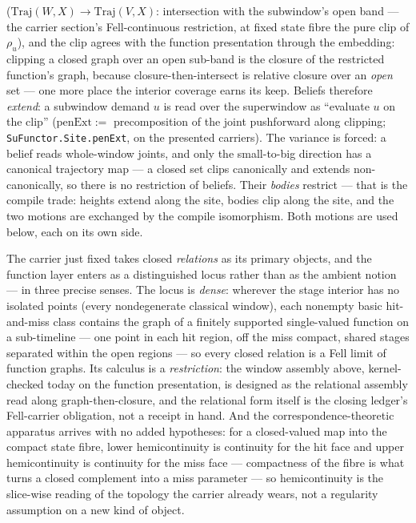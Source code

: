 ($\mathrm{Traj}(W,X) \to \mathrm{Traj}(V,X)$: intersection with the
subwindow's open band --- the carrier section's Fell-continuous
restriction, at fixed state fibre the pure clip of $\rho_u$), and
the clip agrees with the function presentation through the
embedding: clipping a closed graph over an open sub-band is the
closure of the restricted function's graph, because
closure-then-intersect is relative closure over an \emph{open} set
--- one more place the interior coverage earns its keep. Beliefs
therefore \emph{extend}: a subwindow demand
$u$ is read over the superwindow as ``evaluate $u$ on the clip''
($\mathrm{penExt} := $ precomposition of the joint pushforward along
clipping; \texttt{SuFunctor.Site.penExt}, on the presented
carriers). The variance is forced: a
belief reads whole-window
joints, and only the small-to-big direction has a canonical
trajectory map --- a closed set clips canonically and extends
non-canonically, so there is no restriction of beliefs. Their \emph{bodies}
restrict --- that is the compile trade: heights extend along the
site, bodies clip along the site, and the two motions are exchanged
by the compile isomorphism. Both motions are used below, each on its
own side.

\begin{remark}
\label{rem:su-relations-first}
The carrier just fixed takes closed \emph{relations} as its primary
objects, and the function layer enters as a distinguished locus
rather than as the ambient notion --- in three precise senses. The
locus is \emph{dense}: wherever the stage interior has no isolated
points (every nondegenerate classical window), each nonempty basic
hit-and-miss class contains the graph of a finitely supported
single-valued function on a sub-timeline --- one point in each hit
region, off the miss compact, shared stages separated within the
open regions --- so every closed relation is a Fell limit of
function graphs. Its calculus is a \emph{restriction}: the window
assembly above, kernel-checked today on the function presentation,
is designed as the relational assembly read along
graph-then-closure, and the relational form itself is the closing
ledger's Fell-carrier obligation, not a receipt in hand. And the
correspondence-theoretic apparatus arrives with no added
hypotheses: for a closed-valued map into the compact state fibre,
lower hemicontinuity is continuity for the hit face and upper
hemicontinuity is continuity for the miss face --- compactness of
the fibre is what turns a closed complement into a miss parameter
--- so hemicontinuity is the slice-wise reading of the topology the
carrier already wears, not a regularity assumption on a new kind of
object.
\end{remark}

